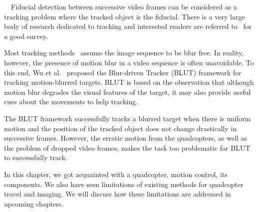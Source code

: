 
~~Fiducial detection between successive video
frames can be considered as a tracking problem where the tracked
object is the fiducial.  There is a very large body of research
dedicated to tracking and interested readers are referred
to~\cite{Yilmaz:2006} for a good survey.

Most tracking methods~\cite{Ross:2008, Wu:2009, Perez02, Mei:2009} assume
the image sequence to be blur free. In reality, however, the presence
of motion blur in a video sequence is often unavoidable. To this end,
Wu et al.~\cite{Wu:2011} proposed the Blur-driven Tracker (BLUT)
framework for tracking motion-blurred targets. BLUT is based on the
observation that although motion blur degrades the visual features of
the target, it may also provide useful cues about the movements to help
tracking.

The BLUT framework successfully tracks a blurred target when there is
uniform motion and the position of the tracked object does not change
drastically in successive frames. However, the erratic motion from the
quadcopters, as well as the problem of dropped video frames, makes the task too
problematic for BLUT to successfully track.

In this chapter, we got acquainted with a quadcopter, motion control, its
components. We also have seen limitations of existing methods for quadcopter
travel and imaging.  We will discuss how these limitations are addressed in
upcoming chapters.
